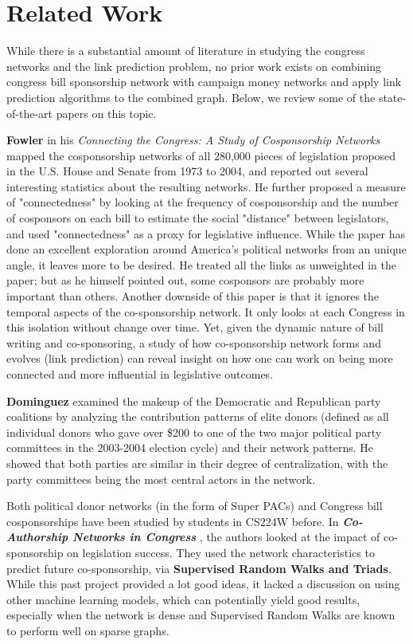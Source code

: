 \documentclass[12pt,twocolumn]{article}
\begin{document}
\section{Related Work}
While there is a substantial amount of literature in studying the congress networks and the link prediction problem, no prior work exists on combining congress bill sponsorship network with campaign money networks and apply link prediction algorithms to the combined graph. Below, we review some of the state-of-the-art papers on this topic. 

\textbf{Fowler} in his \textit{Connecting the Congress: A Study of Cosponsorship Networks} \cite{fowler2006connecting} mapped the cosponsorship networks of all 280,000 pieces of legislation proposed in the U.S. House and Senate from 1973 to 2004, and reported out several interesting statistics about the resulting networks. He further proposed a measure of "connectedness" by looking at the frequency of cosponsorship and the number of cosponsors on each bill to estimate the social "distance" between legislators, and used "connectedness" as a proxy for legislative influence. While the paper has done an excellent exploration around America's political networks from an unique angle, it leaves more to be desired. He treated all the links as unweighted in the paper; but as he himself pointed out, some cosponsors are probably more important than others. Another downside of this paper is that it ignores the temporal aspects of the co-sponsorship network. It only looks at each Congress in this isolation without change over time. Yet, given the dynamic nature of bill writing and co-sponsoring, a study of how co-sponsorship network forms and evolves (link prediction) can reveal insight on how one can work on being more connected and more influential in legislative outcomes. 

\textbf{Dominguez} \cite{dominguez2005groups} examined the makeup of the Democratic and Republican party coalitions by analyzing the contribution patterns of elite donors (defined as  all individual donors who gave over \$200 to one of the two major political party committees in the 2003-2004 election cycle) and their network patterns. He showed that both parties are similar in their degree of centralization, with the party committees being the most central actors in the network. 

Both political donor networks (in the form of Super PACs) and Congress bill cosponsorships have been studied by students in CS224W before. In \textit{\textbf{Co-Authorship Networks in Congress}} \cite{perozo_garcia_banerjee_2016}, the authors looked at the impact of co-sponsorship on legislation success.  They used the network characteristics to predict future co-sponsorship, via \textbf{Supervised Random Walks and Triads}. While this past project provided a lot good ideas, it lacked a discussion on using other machine learning models, which can potentially yield good results, especially when the network is dense and Supervised Random Walks are known to perform well on sparse graphs.
\end{document}
